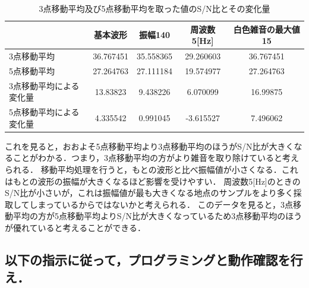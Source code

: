 \documentclass[titlepage]{jarticle}
\begin{document}
\begin{table}[H]
  \caption{3点移動平均及び5点移動平均を取った値のS/N比とその変化量}
  \label{tab:snr2}
  \centering
  \begin{tabular}{l|cccc}\hline
                            & 基本波形  & 振幅140   & 周波数5{[}Hz{]} & 白色雑音の最大値15 \\\hline\hline
    3点移動平均             & 36.767451 & 35.558365 & 29.260603       & 36.767451          \\
    5点移動平均             & 27.264763 & 27.111184 & 19.574977       & 27.264763          \\
    3点移動平均による変化量 & 13.83823  & 9.438226  & 6.070099        & 16.99875           \\
    5点移動平均による変化量 & 4.335542  & 0.991045  & -3.615527       & 7.496062           \\\hline
  \end{tabular}
\end{table}
これを見ると，おおよそ5点移動平均より3点移動平均のほうがS/N比が大きくなることがわかる．つまり，3点移動平均の方がより雑音を取り除けていると考えられる．
移動平均処理を行うと，もとの波形と比べ振幅値が小さくなる．これはもとの波形の振幅が大きくなるほど影響を受けやすい．
周波数5[Hz]のときのS/N比が小さいが，これは振幅値が最も大きくなる地点のサンプルをより多く採取してしまっているからではないかと考えられる．
このデータを見ると，3点移動平均の方が5点移動平均よりS/N比が大きくなっているため3点移動平均のほうが優れていると考えることができる．
\subsection{以下の指示に従って，プログラミングと動作確認を行え．}
\setcounter{subsubsection}{2}
\end{document}
